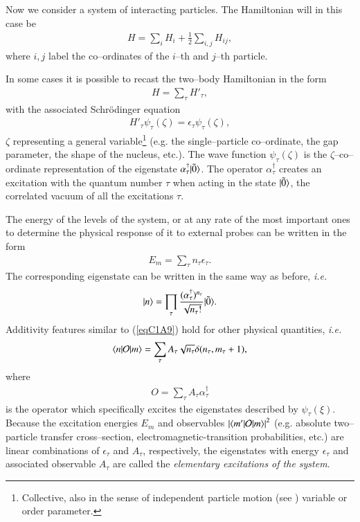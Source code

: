 Now we consider a system of interacting particles. The Hamiltonian will in this case be
\begin{align}\label{eqC1A6}
H=\sum_i H_i+\frac{1}{2}\sum_{i,j}H_{ij},
\end{align}
where $i,j$ label the co--ordinates of the $i$--th and $j$--th particle.

In some cases it is possible to recast the two--body Hamiltonian in the form
\begin{align}\label{eqC1A7}
H=\sum_\tau H'_\tau,
\end{align}
with the associated Schr\"odinger equation
\begin{align}\label{eqC1A8}
H'_\tau\psi_\tau(\zeta)=\epsilon_\tau \psi_\tau(\zeta),
\end{align}
$\zeta$ representing a general variable\footnote{Collective, also in the sense of independent particle motion (see \cite{Mottelson:62}) variable or order parameter.} (e.g. the single--particle co--ordinate, the gap parameter, the shape of the nucleus, etc.). The wave function $\psi_\tau(\zeta)$ is the $\zeta$--co--ordinate representation of the eigenstate $\alpha_\tau^\dagger|{\tilde 0} \rangle$. The operator $\alpha_\tau^\dagger$ creates an excitation with the quantum number $\tau$ when acting in the state $|{\tilde 0} \rangle$, the correlated vacuum of all the excitations $\tau$.



The energy of the levels of the system, or at any rate of the most important
ones to determine the physical response of it to external probes can be written
in the form
\begin{align}\label{eqC1A9}
E_m=\sum_{\tau}n_\tau \epsilon_\tau.
\end{align}
The corresponding eigenstate can be written in the same way as before, \textit{i.e.}
\begin{align}\label{eqC1A10}
|{n} \rangle=\prod_\tau\frac{(\alpha_\tau^\dagger)^{n_\tau}}{\sqrt{n_\tau!}}|{\tilde 0} \rangle.
\end{align}
Additivity features similar to (\ref{eqC1A9}) hold for other physical quantities, \textit{i.e.}
\begin{align}\label{eqC1A11}
\langle {n|\mathcal O|m} \rangle=\sum_{\tau}A_\tau\sqrt{n_\tau} \delta(n_\tau,m_\tau+1),
\end{align}
where
\begin{align}\label{eqC1A12} O=\sum_{\tau}A_\tau \alpha_\tau^\dagger
\end{align}
is the operator which specifically excites the eigenstates described by $\psi_\tau(\xi)$.
Because the excitation energies $E_m$ and observables $\left|\langle {m'|\mathcal O|m} \rangle\right|^2$ (e.g. absolute two--particle transfer cross--section, electromagnetic-transition probabilities, etc.) are
linear combinations of $\epsilon_\tau$ and $A_\tau$, respectively, the eigenstates with energy $\epsilon_\tau$
and associated observable $A_\tau$ are called the \textit{elementary excitations of the system}.


